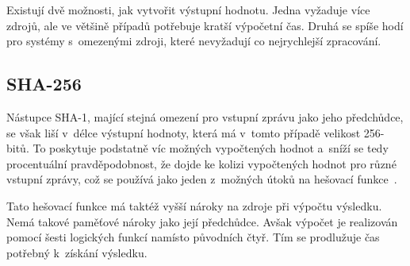 Existují dvě možnosti, jak vytvořit výstupní hodnotu. Jedna vyžaduje více zdrojů, ale ve většině
případů potřebuje kratší výpočetní čas. Druhá se spíše hodí
pro systémy s~omezenými zdroji, které nevyžadují co nejrychlejší zpracování.


\subsection{SHA-256}
Nástupce SHA-1, mající stejná omezení pro vstupní zprávu jako jeho předchůdce, se však liší v~délce
výstupní hodnoty, která má v~tomto případě velikost 256-bitů. To poskytuje podstatně víc možných
vypočtených hodnot a~sníží se tedy procentuální pravděpodobnost, že dojde ke kolizi vypočtených
hodnot pro různé vstupní zprávy, což se používá jako jeden z~možných útoků na hešovací
funkce~\cite{NIST:2015}.

Tato hešovací funkce má taktéž vyšší nároky na zdroje při výpočtu výsledku. Nemá takové paměťové
nároky jako její předchůdce. Avšak výpočet je realizován pomocí šesti logických funkcí namísto
původních čtyř. Tím se prodlužuje čas potřebný k~získání výsledku.

